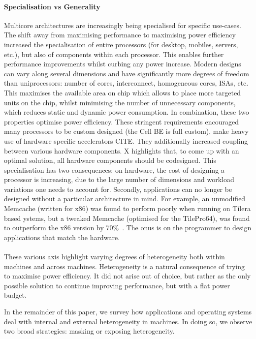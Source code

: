 \paragraph{Specialisation vs Generality} 
Multicore architectures are increasingly being
specialised for specific use-cases. The shift away from maximising 
performance to maximising power efficiency increased 
the specialisation of entire processors (for desktop, mobiles,
servers, etc.), but also of components within each processor. This enables further
performance improvements whilst curbing any power increase. 
Modern designs can vary along several dimensions and have significantly
more degrees of freedom than uniprocessors: number of cores, interconnect, 
homogeneous cores, ISAs, etc. This maximises the available area on chip which
allows to place more targeted units on the chip,
whilst minimising the number of unnecessary components, which 
reduces static and dynamic power consumption. In combination,
these two properties optimise power efficiency. 
These stringent requirements encouraged many processors to be custom designed
(the Cell BE is full custom), make heavy use of hardware specific accelerators CITE. They additionally increased coupling between various hardware components.
X  highlights that, to come up with an optimal solution, all hardware components should be codesigned.  This specialisation has two consequences: 
on hardware, the cost of designing a processor is increasing, due 
to the large number of dimensions and workload variations one needs to account for. 
Secondly, applications can no longer be designed without a particular architecture in mind. For example,  an unmodified Memcache (written for x86) was found to perform poorly when  running on Tilera based ystems, but a tweaked Memcache (optimised for the TilePro64),  was found to outperform the x86 version by 70\%~\cite{berezecki2011manycore}. The onus is on the programmer to design applications that match the hardware.



\paragraph{}  These various axis highlight varying degrees of heterogeneity both within
machines and across machines. Heterogeneity is a natural consequence of 
trying to maximise power efficiency. It did not arise out of choice,  but rather as
the only possible solution to continue improving performance, but with 
a flat power budget. 

In the remainder of this paper, we survey how applications and operating
systems deal with internal and external heterogeneity in machines. 
In doing so, we observe two broad strategies: masking or exposing heterogeneity. 

